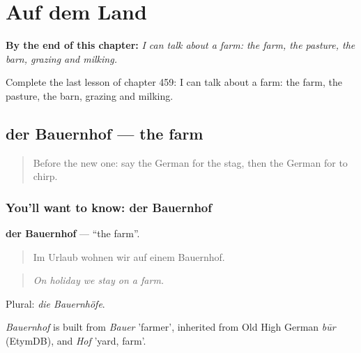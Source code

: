 
\chapter{Auf dem Land}
\label{ch:ge-auf-dem-land}

\begin{chapteropening}
\textbf{By the end of this chapter:} \emph{I can talk about a farm: the farm, the pasture, the barn, grazing and milking.}

Complete the last lesson of chapter 459: I can talk about a farm: the farm, the pasture, the barn, grazing and milking.
\end{chapteropening}

\section[der Bauernhof]{der Bauernhof — the farm}

\label{lesson:GE-C459-bauernhof}



\begin{quote}
Before the new one: say the German for the stag, then the German for to chirp.
\end{quote}

\subsection*{You'll want to know: der Bauernhof}
\textbf{der Bauernhof} — \textquotedblleft{}the farm\textquotedblright{}.

\begin{quote}
Im Urlaub wohnen wir auf einem Bauernhof.
\end{quote}

\begin{quote}
\emph{On holiday we stay on a farm.}
\end{quote}

Plural: \emph{die Bauernhöfe}.

\begin{cousinweb}
\emph{Bauernhof} is built from \emph{Bauer} 'farmer', inherited from Old High German \emph{būr} (EtymDB), and \emph{Hof} 'yard, farm'.
\end{cousinweb}

